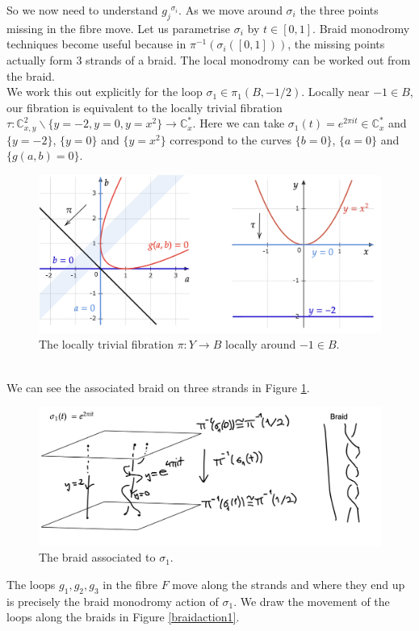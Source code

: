 \documentclass[oneside]{amsart}
\theoremstyle{definition}
\theoremstyle{definition}
\theoremstyle{definition}
\theoremstyle{definition}
\newcommand{\CC}{\mathbb{C}}
\begin{document}
So we now need to understand ${g_j}^{\sigma_i}$. As we move around $\sigma_i$ the three points missing in the fibre move. Let us parametrise $\sigma_i$ by $t \in [0,1 ]$. Braid monodromy techniques become useful because in $\pi^{-1}(\sigma_i([0,1]))$, the missing points actually form 3 strands of a braid. The local monodromy can be worked out from the braid. \\
\newline
We work this out explicitly for the loop $\sigma_1\in \pi_1(B,-1/2)$. Locally near $-1 \in B$, our fibration is equivalent to the locally trivial fibration $\tau : \CC^2_{x,y}\backslash \{ y=-2, y=0, y=x^2\} \to \CC_x^*$. Here we can take $\sigma_1(t) = e^{2\pi it} \in \CC_x^*$ and $\{ y=-2\}$, $\{y=0\}$ and $\{y =x^2\}$ correspond to the curves $\{b=0\}$, $\{a=0\}$ and $\{ g(a,b)=0\}$. 
\begin{figure}[!h]
    \centering
    \includegraphics[width=12cm]{rank2exmp/exmp1tau.png}
    \caption{The locally trivial fibration $\pi: Y \to B$ locally around $-1 \in B$.}
\end{figure}
\\
We can see the associated braid on three strands in Figure \ref{sigma1}.
\begin{figure}[!h]
    \centering
    \includegraphics[width=12cm]{rank2exmp/sigma1.png}
    \caption{The braid associated to $\sigma_1$.}
    \label{sigma1}
\end{figure}
The loops $g_1,g_2,g_3$ in the fibre $F$ move along the strands and where they end up is precisely the braid monodromy action of $\sigma_1$. We draw the movement of the loops along the braids in Figure \ref{braidaction1}.
\end{document}
